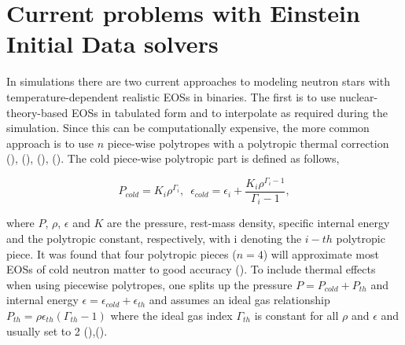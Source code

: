 \section{Current problems with Einstein Initial Data solvers}

In simulations there are two current approaches to modeling neutron stars with temperature-dependent realistic EOSs in binaries. The first is to use nuclear-theory-based EOSs in tabulated form and to interpolate as required during the simulation. Since this can be computationally expensive, the more common approach is to use $n$ piece-wise polytropes with a polytropic thermal correction (\cite{deaton2013black}), (\cite{kyutoku2013black}), (\cite{bauswein2014revealing}), (\cite{kyutoku2015dynamical}). The cold piece-wise polytropic part is defined as follows,

\begin{equation}
\label{eq:7}
P_{cold} = K_i\rho^{\Gamma_i},\,\,\, \epsilon_{cold} = \epsilon_i + \frac{K_{i}\rho^{\Gamma_{i}-1}}{\Gamma_{i}-1},
\end{equation}

where $P$, $\rho$, $\epsilon$ and $K$ are the pressure, rest-mass density, specific internal energy and the polytropic constant, respectively, with i denoting the $i-th$ polytropic piece. It was found that four polytropic pieces ($n=4$) will approximate most EOSs of cold neutron matter to good accuracy (\cite{read2008neutron}). To include thermal effects when using piecewise polytropes, one splits up the pressure $P = P_{cold} + P_{th}$ and internal energy $\epsilon = \epsilon_{cold}+\epsilon_{th}$ and assumes an ideal gas relationship $P_{th} = \rho \epsilon_{th}(\Gamma_{th}-1)$ where the ideal gas index $\Gamma_{th}$ is constant for all $\rho$ and $\epsilon$ and usually set to 2 (\cite{bauswein2010testing}),(\cite{takami2014constraining}).

